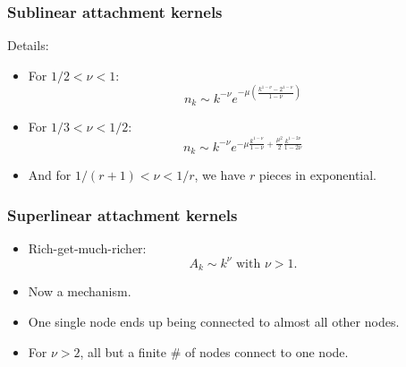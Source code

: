\begin{frame}
  \frametitle{Sublinear attachment kernels}

  \begin{block}{Details:}
    \begin{itemize}
    \item<1->
      For $1/2 < \nu < 1$:
      $$
      n_k \sim k^{-\nu} e^{-\mu \left(\frac{k^{1-\nu} - 2^{1-\nu}}{1-\nu} \right)}
      $$
    \item<2->
      For $1/3 < \nu < 1/2$:
      $$
      n_k \sim k^{-\nu} e^{-\mu \frac{k^{1-\nu}}{1-\nu} + \frac{\mu^2}{2}\frac{k^{1-2\nu}}{1-2\nu}}
      $$
    \item<3->
      And for $1/(r+1) < \nu < 1/r$, we have $r$ pieces in exponential.
    \end{itemize}
  \end{block}

\end{frame}


\begin{frame}
  \frametitle{Superlinear attachment kernels}

  \begin{block}{}
  \begin{itemize}
  \item<1->
    Rich-get-much-richer:
    $$
    A_k \sim k^\nu
    \mbox{\ with $\nu > 1$.}
    $$
  \item<2->
    Now a  mechanism.
  \item<3->
    One single node ends up being connected to
    almost all other nodes.
  \item<4->
    For $\nu>2$, all but a finite \# of nodes connect
    to one node.
  \end{itemize}
  \end{block}
  
\end{frame}







